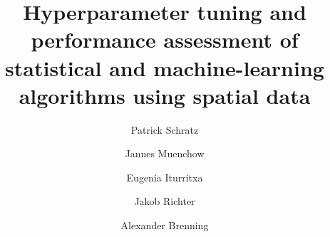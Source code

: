 \documentclass[review]{elsarticle}
\begin{document}
 

\begin{frontmatter}

	\title{Hyperparameter tuning and performance assessment of statistical and machine-learning algorithms using spatial data} 

	\author[FSU]{Patrick Schratz}

	\author[FSU]{Jannes Muenchow}
	\author[NEIKER]{Eugenia Iturritxa}
	\author[TUDO]{Jakob Richter}
	\author[FSU]{Alexander Brenning}

	\address[FSU]{Department of Geography, GIScience group, Grietgasse 6, 07743, Jena, Germany}
	\address[NEIKER]{NEIKER, Granja Modelo –Arkaute, Apdo. 46, 01080 Vitoria-Gasteiz, Arab, Spain}
	\address[TUDO]{Department of Statistics, TU Dortmund University, Germany}


\end{frontmatter}
\end{document}
